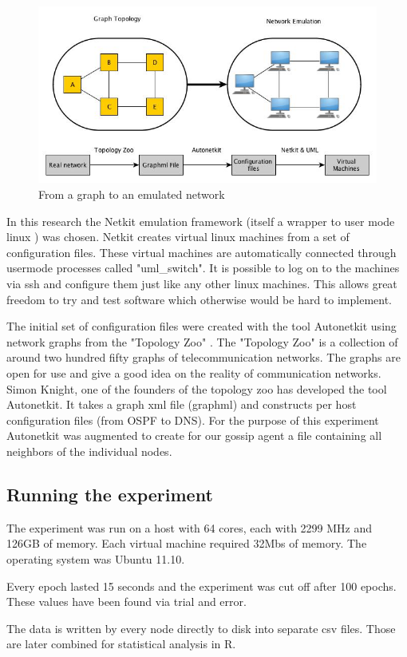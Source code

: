 \begin{figure}[h!]
    \begin{center}
        \includegraphics[scale=0.6]{graph_to_emulation}
    \end{center}
    \caption{From a graph to an emulated network}
    \label{fig:graph_to_emulation}
\end{figure}

In this research the Netkit emulation framework (itself a wrapper to user mode linux \cite{uml}) was chosen. Netkit \cite{netkit} creates virtual linux machines from a set of configuration files. These virtual machines are automatically connected through usermode processes called "uml\_switch". It is possible to log on to the machines via ssh and configure them just like any other linux machines. This allows great freedom to try and test software which otherwise would be hard to implement.

The initial set of configuration files were created with the tool Autonetkit \cite{autonetkit} using network graphs from the "Topology Zoo" \cite{knight_internet_2011}. The "Topology Zoo" is a collection of around two hundred fifty graphs of telecommunication networks. The graphs are open for use and give a good idea on the reality of communication networks. Simon Knight, one of the founders of the topology zoo has developed the tool Autonetkit. It takes a graph xml file (graphml) and constructs per host configuration files (from OSPF to DNS). For the purpose of this experiment Autonetkit was augmented to create for our gossip agent a file containing all neighbors of the individual nodes.

\subsection{Running the experiment}
The experiment was run on a host with 64 cores, each with 2299 MHz and 126GB of memory. Each virtual machine required 32Mbs of memory. The operating system was Ubuntu 11.10.

Every epoch lasted 15 seconds and the experiment was cut off after 100 epochs. These values have been found via trial and error.

The data is written by every node directly to disk into separate csv files. Those are later combined for statistical analysis in R.
